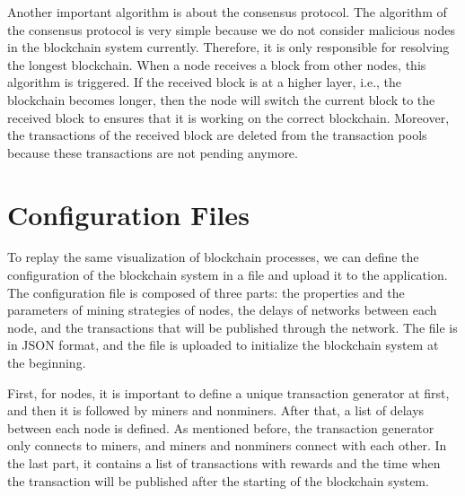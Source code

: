 Another important algorithm is about the consensus protocol. The algorithm of the consensus protocol is very simple because we do not consider malicious nodes in the blockchain system currently. Therefore, it is only responsible for resolving the longest blockchain. When a node receives a block from other nodes, this algorithm is triggered. If the received block is at a higher layer, i.e., the blockchain becomes longer, then the node will switch the current block to the received block to ensures that it is working on the correct blockchain. Moreover, the transactions of the received block are deleted from the transaction pools because these transactions are not pending anymore.

\section{Configuration Files}

To replay the same visualization of blockchain processes, we can define the configuration of the blockchain system in a file and upload it to the application. The configuration file is composed of three parts: the properties and the parameters of mining strategies of nodes, the delays of networks between each node, and the transactions that will be published through the network. The file is in JSON format, and the file is uploaded to initialize the blockchain system at the beginning.

First, for nodes, it is important to define a unique transaction generator at first, and then it is followed by miners and nonminers. After that, a list of delays between each node is defined. As mentioned before, the transaction generator only connects to miners, and miners and nonminers connect with each other. In the last part, it contains a list of transactions with rewards and the time when the transaction will be published after the starting of the blockchain system.

